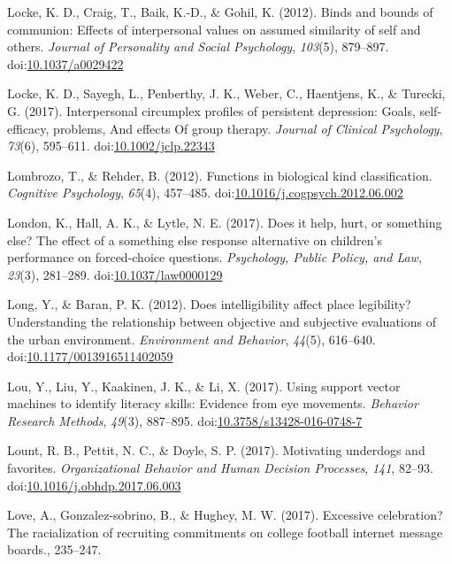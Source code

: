 \documentclass[english,man]{apa6}
\begin{document}
\hypertarget{ref-Locke}{}
Locke, K. D., Craig, T., Baik, K.-D., \& Gohil, K. (2012). Binds and
bounds of communion: Effects of interpersonal values on assumed
similarity of self and others. \emph{Journal of Personality and Social
Psychology}, \emph{103}(5), 879--897.
doi:\href{https://doi.org/10.1037/a0029422}{10.1037/a0029422}

\hypertarget{ref-Locke2017}{}
Locke, K. D., Sayegh, L., Penberthy, J. K., Weber, C., Haentjens, K., \&
Turecki, G. (2017). Interpersonal circumplex profiles of persistent
depression: Goals, self-efficacy, problems, And effects Of group
therapy. \emph{Journal of Clinical Psychology}, \emph{73}(6), 595--611.
doi:\href{https://doi.org/10.1002/jclp.22343}{10.1002/jclp.22343}

\hypertarget{ref-Lombrozo2012}{}
Lombrozo, T., \& Rehder, B. (2012). Functions in biological kind
classification. \emph{Cognitive Psychology}, \emph{65}(4), 457--485.
doi:\href{https://doi.org/10.1016/j.cogpsych.2012.06.002}{10.1016/j.cogpsych.2012.06.002}

\hypertarget{ref-London2017}{}
London, K., Hall, A. K., \& Lytle, N. E. (2017). Does it help, hurt, or
something else? The effect of a something else response alternative on
children's performance on forced-choice questions. \emph{Psychology,
Public Policy, and Law}, \emph{23}(3), 281--289.
doi:\href{https://doi.org/10.1037/law0000129}{10.1037/law0000129}

\hypertarget{ref-Long2012}{}
Long, Y., \& Baran, P. K. (2012). Does intelligibility affect place
legibility? Understanding the relationship between objective and
subjective evaluations of the urban environment. \emph{Environment and
Behavior}, \emph{44}(5), 616--640.
doi:\href{https://doi.org/10.1177/0013916511402059}{10.1177/0013916511402059}

\hypertarget{ref-Lou2017}{}
Lou, Y., Liu, Y., Kaakinen, J. K., \& Li, X. (2017). Using support
vector machines to identify literacy skills: Evidence from eye
movements. \emph{Behavior Research Methods}, \emph{49}(3), 887--895.
doi:\href{https://doi.org/10.3758/s13428-016-0748-7}{10.3758/s13428-016-0748-7}

\hypertarget{ref-Lount2017}{}
Lount, R. B., Pettit, N. C., \& Doyle, S. P. (2017). Motivating
underdogs and favorites. \emph{Organizational Behavior and Human
Decision Processes}, \emph{141}, 82--93.
doi:\href{https://doi.org/10.1016/j.obhdp.2017.06.003}{10.1016/j.obhdp.2017.06.003}

\hypertarget{ref-Love2017}{}
Love, A., Gonzalez-sobrino, B., \& Hughey, M. W. (2017). Excessive
celebration? The racialization of recruiting commitments on college
football internet message boards., 235--247.
\end{document}
